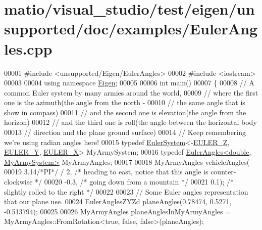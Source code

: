 \hypertarget{matio_2visual__studio_2test_2eigen_2unsupported_2doc_2examples_2_euler_angles_8cpp_source}{}\section{matio/visual\+\_\+studio/test/eigen/unsupported/doc/examples/\+Euler\+Angles.cpp}
\label{matio_2visual__studio_2test_2eigen_2unsupported_2doc_2examples_2_euler_angles_8cpp_source}

\begin{DoxyCode}
00001 \textcolor{preprocessor}{#include <unsupported/Eigen/EulerAngles>}
00002 \textcolor{preprocessor}{#include <iostream>}
00003 
00004 \textcolor{keyword}{using namespace }\hyperlink{namespace_eigen}{Eigen};
00005 
00006 \textcolor{keywordtype}{int} main()
00007 \{
00008   \textcolor{comment}{// A common Euler system by many armies around the world,}
00009   \textcolor{comment}{//  where the first one is the azimuth(the angle from the north -}
00010   \textcolor{comment}{//   the same angle that is show in compass)}
00011   \textcolor{comment}{//  and the second one is elevation(the angle from the horizon)}
00012   \textcolor{comment}{//  and the third one is roll(the angle between the horizontal body}
00013   \textcolor{comment}{//   direction and the plane ground surface)}
00014   \textcolor{comment}{// Keep remembering we're using radian angles here!}
00015   \textcolor{keyword}{typedef} \hyperlink{class_eigen_1_1_euler_system}{EulerSystem}<-\hyperlink{namespace_eigen_ae614aa7cdd687fb5c421a54f2ce5c361a0c641fd5050b5219d6c172ac83fb379d}{EULER\_Z}, \hyperlink{namespace_eigen_ae614aa7cdd687fb5c421a54f2ce5c361a7309edb53a9d9cdb77fac7c1e9200263}{EULER\_Y}, \hyperlink{namespace_eigen_ae614aa7cdd687fb5c421a54f2ce5c361ae8110af93d433bfcf247d6bac5e1d387}{EULER\_X}> MyArmySystem;
00016   \textcolor{keyword}{typedef} \hyperlink{class_eigen_1_1_euler_angles}{EulerAngles<double, MyArmySystem>} MyArmyAngles;
00017   
00018   MyArmyAngles vehicleAngles(
00019     3.14\textcolor{comment}{/*PI*/} / 2, \textcolor{comment}{/* heading to east, notice that this angle is counter-clockwise */}
00020     -0.3, \textcolor{comment}{/* going down from a mountain */}
00021     0.1); \textcolor{comment}{/* slightly rolled to the right */}
00022   
00023   \textcolor{comment}{// Some Euler angles representation that our plane use.}
00024   EulerAnglesZYZd planeAngles(0.78474, 0.5271, -0.513794);
00025   
00026   MyArmyAngles planeAnglesInMyArmyAngles = MyArmyAngles::FromRotation<true, false, false>(planeAngles);

\end{DoxyCode}

